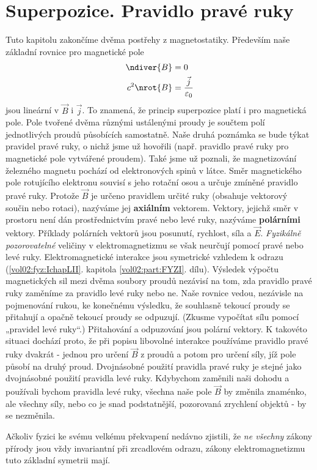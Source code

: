   \section{Superpozice. Pravidlo pravé ruky}\label{fyz:IIchapXIIIsecVIII}
    Tuto kapitolu zakončíme dvěma postřehy z magnetostatiky. Především naše základní rovnice pro
    magnetické pole
    \begin{align*}
         \ndiver{B} &= 0                                       \\
        c^2\nrot{B} &= \dfrac{\vec{j}}{\varepsilon_0} 
    \end{align*}
    jsou lineární v \(\vec{B}\) i \(\vec{j}\). To znamená, že princip superpozice platí i pro
    magnetická pole. Pole tvořené dvěma různými ustálenými proudy je součtem polí jednotlivých
    proudů působících samostatně. Naše druhá poznámka se bude týkat pravidel pravé ruky, o nichž
    jsme už hovořili (např. pravidlo pravé ruky pro magnetické pole vytvářené proudem). Také jsme už
    poznali, že magnetizování železného magnetu pochází od elektronových spinů v látce. Směr
    magnetického pole rotujícího elektronu souvisí s jeho rotační osou a určuje zmíněné pravidlo
    pravé ruky. Protože \(\vec{B}\) je určeno pravidlem určité ruky (obsahuje vektorový součin nebo
    rotaci), nazýváme jej \textbf{axiálním} vektorem. Vektory, jejichž směr v prostoru není dán
    prostřednictvím pravé nebo levé ruky, nazýváme \textbf{polárními} vektory. Příklady polárních
    vektorů jsou posunutí, rychlost, síla a \(\vec{E}\). \emph{Fyzikálně pozorovatelné} veličiny v
    elektromagnetizmu se však neurčují pomocí pravé nebo levé ruky. Elektromagnetické interakce jsou
    symetrické vzhledem k odrazu (\ref{vol02:fyz:IchapLII}. kapitola \ref{vol02:part:FYZI}. dílu).
    Výsledek výpočtu magnetických sil mezi dvěma soubory proudů nezávisí na tom, zda pravidlo pravé
    ruky zaměníme za pravidlo levé ruky nebo ne. Naše rovnice vedou, nezávisle na pojmenování rukou,
    ke konečnému výsledku, že souhlasně tekoucí proudy se přitahují a opačně tekoucí proudy se
    odpuzují. (Zkusme vypočítat sílu pomocí „pravidel levé ruky“.) Přitahování a odpuzování jsou
    polární vektory. K takovéto situaci dochází proto, že při popisu libovolné interakce používáme
    pravidlo pravé ruky dvakrát - jednou pro určení \(\vec{B}\) z proudů a potom pro určení síly,
    jíž pole působí na druhý proud. Dvojnásobné použití pravidla pravé ruky je stejné jako
    dvojnásobné použití pravidla levé ruky. Kdybychom zaměnili naši dohodu a používali bychom
    pravidla levé ruky, všechna naše pole \(\vec{B}\) by změnila znaménko, ale všechny síly, nebo co
    je snad podstatnější, pozorovaná zrychlení objektů - by se nezměnila.
    
    Ačkoliv fyzici ke svému velkému překvapení nedávno zjistili, že \emph{ne všechny} zákony přírody
    jsou vždy invariantní při zrcadlovém odrazu, zákony elektromagnetizmu tuto základní symetrii
    mají.

